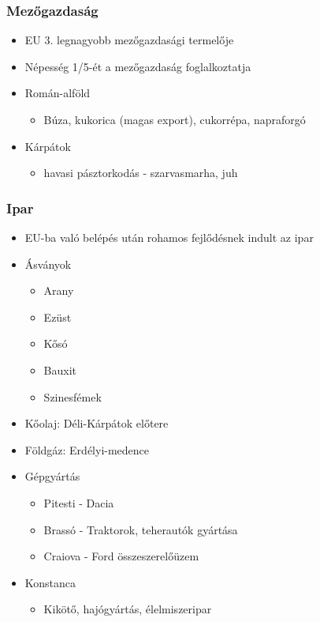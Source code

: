 \documentclass{article}
\begin{document}
\subsubsection{Mezőgazdaság}
\begin{itemize}
    \item EU 3. legnagyobb mezőgazdasági termelője
    \item Népesség 1/5-ét a mezőgazdaság foglalkoztatja
    \item Román-alföld 
    \begin{itemize}
        \item Búza, kukorica (magas export), cukorrépa, napraforgó
    \end{itemize}
    \item Kárpátok
    \begin{itemize}
        \item havasi pásztorkodás - szarvasmarha, juh
    \end{itemize}
\end{itemize}

\subsubsection{Ipar}
\begin{itemize}
    \item EU-ba való belépés után rohamos fejlődésnek indult az ipar
    \item Ásványok
    \begin{itemize}
        \item Arany
        \item Ezüst
        \item Kősó
        \item Bauxit
        \item Szinesfémek
    \end{itemize}
    \item Kőolaj: Déli-Kárpátok előtere
    \item Földgáz: Erdélyi-medence
    \item Gépgyártás
    \begin{itemize}
        \item Pitesti - Dacia
        \item Brassó - Traktorok, teherautók gyártása
        \item Craiova - Ford összeszerelőüzem
    \end{itemize}
    \item Konstanca 
    \begin{itemize}
        \item Kikötő, hajógyártás, élelmiszeripar
    \end{itemize}
\end{itemize}
\end{document}
